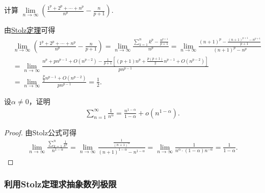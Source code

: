 \documentclass[../../main.tex]{subfiles}%
\begin{document}
\begin{example}
计算 $\lim\limits_{n\to\infty}\left( \frac{1^p+2^p+\cdots +n^p}{n^p}-\frac{n}{p+1} \right)$.
\end{example}
\begin{solution}
由\hyperref[theorem:Stolz定理]{Stolz定理}可得
\begin{align*}
&\lim\limits_{n\to\infty}\left( \frac{1^p+2^p+\cdots +n^p}{n^p}-\frac{n}{p+1} \right) 
= \lim\limits_{n\to\infty}\frac{\sum\limits_{k=1}^n k^p-\frac{n^{p+1}}{p+1}}{n^p} = \lim\limits_{n\to\infty}\frac{(n+1)^p-\frac{(n+1)^{p+1}-n^{p+1}}{p+1}}{(n+1)^p-n^p} \\
&= \lim\limits_{n\to\infty}\frac{n^p+pn^{p-1}+O(n^{p-2})-\frac{1}{p+1}\left[(p+1)n^p+\frac{p(p+1)}{2}n^{p-1}+O(n^{p-2})\right]}{pn^{p-1}} \\
&= \lim\limits_{n\to\infty}\frac{\frac{p}{2}n^{p-1}+O(n^{p-2})}{pn^{p-1}} = \frac{1}{2}.
\end{align*}
\end{solution}

\begin{proposition}\label{proposition:幂次小于1的级数的阶}
设$\alpha \ne 0$，证明
\begin{align*}
\sum_{n=1}^{\infty}{\frac{1}{n^{\alpha}}}=\frac{n^{1-\alpha}}{1-\alpha}+o\left( n^{1-\alpha} \right) .
\end{align*}
\end{proposition}
\begin{proof}
由Stolz公式可得
\begin{align*}
\lim_{n\rightarrow \infty} \frac{\sum\limits_{k=1}^n{\frac{1}{k^{\alpha}}}}{n^{1-\alpha}}=\lim_{n\rightarrow \infty} \frac{\frac{1}{\left( n+1 \right) ^{\alpha}}}{\left( n+1 \right) ^{1-\alpha}-n^{1-\alpha}}=\lim_{n\rightarrow \infty} \frac{1}{n^{\alpha}\cdot \left( 1-\alpha \right) n^{-\alpha}}=\frac{1}{1-\alpha}.
\end{align*}
\end{proof}



\subsubsection{利用Stolz定理求抽象数列极限}
\end{document}
